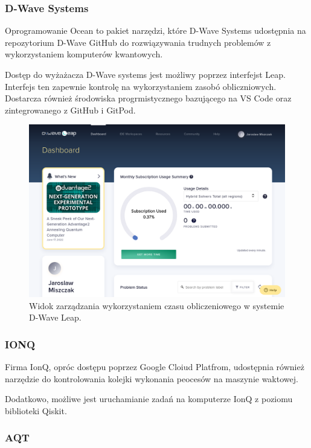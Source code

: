 \documentclass[a4paper,12pt
]{article}
\begin{document}
\hypertarget{d-wave-systems}{%
\subsubsection{D-Wave Systems}\label{d-wave-systems}}

Oprogramowanie Ocean to pakiet narzędzi, które D-Wave Systems udostępnia
na repozytorium D-Wave GitHub do rozwiązywania trudnych problemów z
wykorzystaniem komputerów kwantowych.

Dostęp do wyżażacza D-Wave systems jest możliwy poprzez interfejst Leap.
Interfejs ten zapewnie kontrolę na wykorzystaniem zasobó obliczniowych.
Dostarcza również środowiska progrmistycznego bazującego na VS Code oraz
zintegrowanego z GitHub i GitPod.

\begin{figure}
\centering
\includegraphics{d-wave-leap-dashboard.png}
\caption{Widok zarządzania wykorzystaniem czasu obliczeniowego w
systemie D-Wave Leap.}
\end{figure}

\hypertarget{ionq}{%
\subsubsection{IONQ}\label{ionq}}

Firma IonQ, opróc dostępu poprzez Google Cloiud Platfrom, udostępnia
również narzędzie do kontrolowania kolejki wykonania peocesów na
maszynie waktowej.

Dodatkowo, możliwe jest uruchamianie zadań na komputerze IonQ z poziomu
biblioteki Qiskit.

\hypertarget{aqt}{%
\subsubsection{AQT}\label{aqt}}
\end{document}
